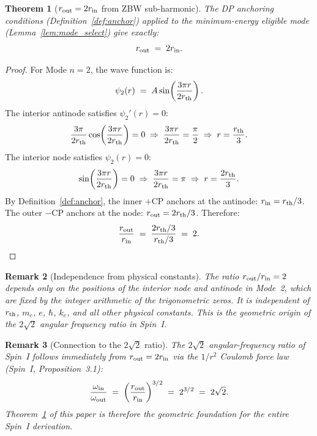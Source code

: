 \documentclass[12pt]{article}
\newtheorem{theorem}{Theorem}[section]
\newtheorem{remark}[theorem]{Remark}
\newcommand{\rth}{r_{\rm th}}
\newcommand{\rin}{r_{\rm in}}
\newcommand{\rout}{r_{\rm out}}
\newcommand{\oin}{\omega_{\rm in}}
\newcommand{\oout}{\omega_{\rm out}}
\begin{document}
\begin{theorem}[$\rout = 2\rin$ from ZBW sub-harmonic]
\label{thm:ratio}
The DP anchoring conditions (Definition~\ref{def:anchor}) applied to
the minimum-energy eligible mode (Lemma~\ref{lem:mode_select}) give
exactly:
\begin{equation}
  \rout \;=\; 2\rin.
  \label{eq:ratio}
\end{equation}
\end{theorem}

\begin{proof}
For Mode $n=2$, the wave function is:
\begin{equation}
  \psi_2(r) \;=\; A\sin\!\left(\frac{3\pi r}{2\rth}\right).
  \label{eq:psi2}
\end{equation}
The interior antinode satisfies $\psi_2'(r) = 0$:
\begin{equation}
  \frac{3\pi}{2\rth}\cos\!\left(\frac{3\pi r}{2\rth}\right) = 0
  \;\Rightarrow\; \frac{3\pi r}{2\rth} = \frac{\pi}{2}
  \;\Rightarrow\; r = \frac{\rth}{3}.
  \label{eq:antinode_pos}
\end{equation}
The interior node satisfies $\psi_2(r) = 0$:
\begin{equation}
  \sin\!\left(\frac{3\pi r}{2\rth}\right) = 0
  \;\Rightarrow\; \frac{3\pi r}{2\rth} = \pi
  \;\Rightarrow\; r = \frac{2\rth}{3}.
  \label{eq:node_pos}
\end{equation}
By Definition~\ref{def:anchor}, the inner $+$CP anchors at the
antinode: $\rin = \rth/3$.  The outer $-$CP anchors at the node:
$\rout = 2\rth/3$.  Therefore:
\begin{equation}
  \frac{\rout}{\rin} \;=\; \frac{2\rth/3}{\rth/3} \;=\; 2.
  \label{eq:ratio_proof}
\end{equation}
\end{proof}

\begin{remark}[Independence from physical constants]
The ratio $\rout/\rin = 2$ depends only on the positions of the
interior node and antinode in Mode~2, which are fixed by the
integer arithmetic of the trigonometric zeros.  It is independent
of $\rth$, $m_e$, $e$, $\hbar$, $k_e$, and all other physical
constants.  This is the geometric origin of the $2\sqrt{2}$ angular
frequency ratio in Spin~I.
\end{remark}

\begin{remark}[Connection to the $2\sqrt{2}$ ratio]
The $2\sqrt{2}$ angular-frequency ratio of Spin~I follows immediately
from $\rout = 2\rin$ via the $1/r^2$ Coulomb force law
(Spin~I, Proposition~3.1):
\begin{equation}
  \frac{\oin}{\oout} \;=\; \left(\frac{\rout}{\rin}\right)^{3/2}
  \;=\; 2^{3/2} \;=\; 2\sqrt{2}.
\end{equation}
Theorem~\ref{thm:ratio} of this paper is therefore the geometric
foundation for the entire Spin~I derivation.
\end{remark}
\end{document}
